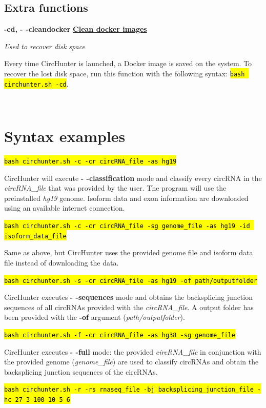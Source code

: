 \documentclass[letterpaper,12pt]{article}
\newcommand{\entry}[4]{
  \begin{minipage}[t]{.05\textwidth}
  \end{minipage}
  \hfill\vline\hfill
  \begin{minipage}[t]{.90\textwidth}
    {\bfseries#1} {\hfill\underline{\bfseries#2}}
    
    \textit{#3}
    
    {#4}
  \end{minipage}\\\vspace{.25cm}}
\newcommand{\code}[1]{\hl{\texttt{#1}}}
\begin{document}
\subsection{Extra functions}

\entry
{-cd, - -cleandocker}
{Clean docker images}
{Used to recover disk space}
{Every time CircHunter is launched, a Docker image is saved on the system. To recover the lost disk space, run this function with the following syntax: \code{bash circhunter.sh -cd}.}

\section{Syntax examples}

\noindent\code{bash circhunter.sh -c -cr circRNA\_file -as hg19}

CircHunter will execute \textbf{- -classification} mode and classify every circRNA in the \textit{circRNA\_file} that was provided by the user. The program will use the preinstalled \textit{hg19} genome. Isoform data and exon information are downloaded using an available internet connection.

\bigskip

\noindent\code{bash circhunter.sh -c -cr circRNA\_file -sg genome\_file -as hg19 -id isoform\_data\_file}

Same as above, but CircHunter uses the provided genome file and isoform data file instead of downloading the data.

\bigskip

\noindent\code{bash circhunter.sh -s -cr circRNA\_file -as hg19 -of path/outputfolder}

CircHunter executes \textbf{- -sequences} mode and obtains the backsplicing junction sequences of all circRNAs provided with the \textit{circRNA\_file}. A output folder has been provided with the \textbf{-of} argument (\textit{path/outputfolder}).

\bigskip

\noindent\code{bash circhunter.sh -f -cr circRNA\_file -as hg38 -sg genome\_file}

CircHunter executes \textbf{- -full} mode: the provided \textit{circRNA\_file} in conjunction with the provided genome (\textit{genome\_file}) are used to classify circRNAs and obtain the backsplicing junction sequences of the circRNAs.

\bigskip

\noindent\code{bash circhunter.sh -r -rs rnaseq\_file -bj backsplicing\_junction\_file -hc 27 3 100 10 5 6}
\end{document}
